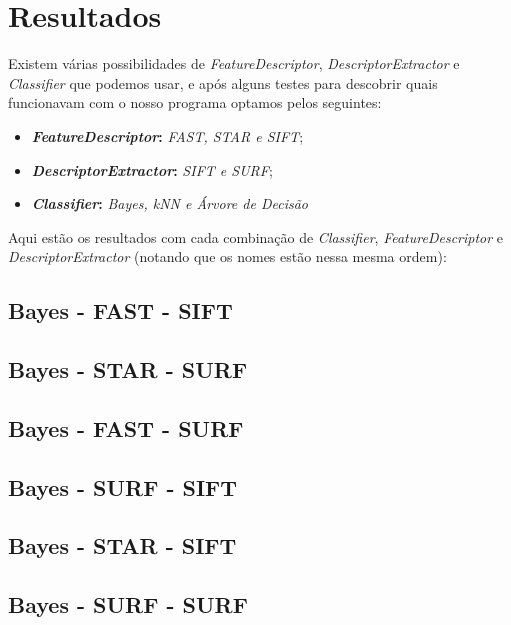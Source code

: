 \section{Resultados}
Existem várias possibilidades de \textit{FeatureDescriptor}, \textit{DescriptorExtractor} e
\textit{Classifier} que podemos usar, e após alguns testes para descobrir quais funcionavam com
o nosso programa optamos pelos seguintes:
\begin{itemize}
  \item \textbf{\textit{FeatureDescriptor}:} \textit{FAST, STAR e SIFT};
  \item \textbf{\textit{DescriptorExtractor}:} \textit{SIFT e SURF};
  \item \textbf{\textit{Classifier}:} \textit{Bayes, kNN e Árvore de Decisão}
\end{itemize}

Aqui estão os resultados com cada combinação de \textit{Classifier}, \textit{FeatureDescriptor} e
\textit{DescriptorExtractor} (notando que os nomes estão nessa mesma ordem):

\subsection{Bayes - FAST - SIFT}


\subsection{Bayes - STAR - SURF}


\subsection{Bayes - FAST - SURF}
  

\subsection{Bayes - SURF - SIFT}
 

\subsection{Bayes - STAR - SIFT}
  

\subsection{Bayes - SURF - SURF}
  

